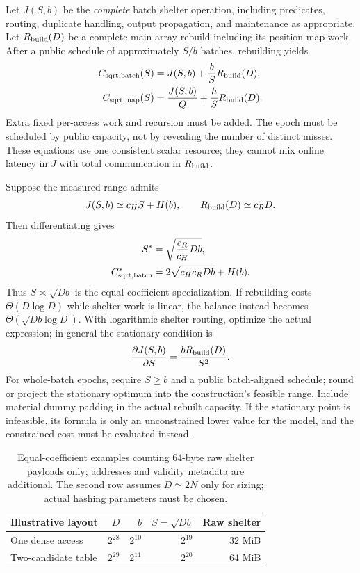 \documentclass[11pt]{article}
\begin{document}
Let $J(S,b)$ be the \emph{complete} batch shelter operation, including predicates,
routing, duplicate handling, output propagation, and maintenance as appropriate.
Let $R_{\rm build}(D)$ be a complete main-array rebuild including its position-map
work. After a public schedule of approximately $S/b$ batches, rebuilding yields
\begin{align}
C_{\rm sqrt,batch}(S)&=J(S,b)+\frac{b}{S}R_{\rm build}(D),\label{eq:sqrt-general}\\
C_{\rm sqrt,map}(S)&=\frac{J(S,b)}{Q}+\frac{h}{S}R_{\rm build}(D).
\end{align}
Extra fixed per-access work and recursion must be added. The epoch must be
scheduled by public capacity, not by revealing the number of distinct misses.
These equations use one consistent scalar resource; they cannot mix online
latency in $J$ with total communication in $R_{\rm build}$.

Suppose the measured range admits
\[
J(S,b)\simeq c_HS+H(b),\qquad R_{\rm build}(D)\simeq c_RD.
\]
Then differentiating gives
\begin{align}
S^*&=\sqrt{\frac{c_R}{c_H}Db},\label{eq:s-opt}\\
C_{\rm sqrt,batch}^*&=2\sqrt{c_Hc_RDb}+H(b).\label{eq:sqrt-opt}
\end{align}
Thus $S\asymp\sqrt{Db}$ is the equal-coefficient specialization. If rebuilding
costs $\Theta(D\log D)$ while shelter work is linear, the balance instead becomes
$\Theta(\sqrt{Db\log D})$. With logarithmic shelter routing, optimize the actual
expression; in general the stationary condition is
\[
\frac{\partial J(S,b)}{\partial S}
=\frac{bR_{\rm build}(D)}{S^2}.
\]
For whole-batch epochs, require $S\geq b$ and a public batch-aligned schedule;
round or project the stationary optimum into the construction's feasible range.
Include material dummy padding in the actual rebuilt capacity. If the stationary
point is infeasible, its formula is only an unconstrained lower value for the
model, and the constrained cost must be evaluated instead.

\begin{table}[htbp]
\centering
\begin{tabular}{@{}lrrrr@{}}
\toprule
Illustrative layout & $D$ & $b$ & $S=\sqrt{Db}$ & Raw shelter \\
\midrule
One dense access & $2^{28}$ & $2^{10}$ & $2^{19}$ & 32 MiB \\
Two-candidate table & $2^{29}$ & $2^{11}$ & $2^{20}$ & 64 MiB \\
\bottomrule
\end{tabular}
\caption{Equal-coefficient examples counting 64-byte raw shelter payloads only;
addresses and validity metadata are additional. The second
row assumes $D\simeq2N$ only for sizing; actual hashing parameters must be chosen.}
\end{table}
\end{document}
